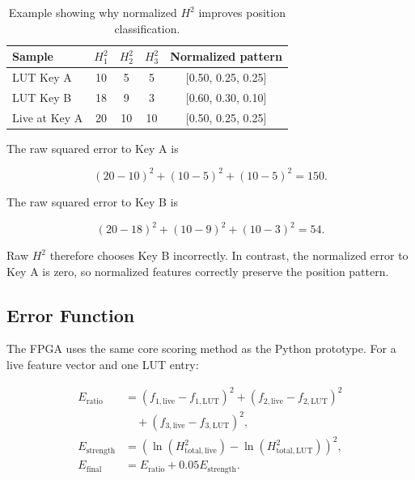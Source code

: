 \begin{table}[H]
    \centering
    \caption{Example showing why normalized $H^2$ improves position classification.}
    \label{tab:normalization_example}
    \renewcommand{\arraystretch}{1.2}
    \begin{tabular}{l c c c c}
        \toprule
        \textbf{Sample} & $H_1^2$ & $H_2^2$ & $H_3^2$ & \textbf{Normalized pattern} \\
        \midrule
        LUT Key A & 10 & 5 & 5 & [0.50, 0.25, 0.25] \\
        LUT Key B & 18 & 9 & 3 & [0.60, 0.30, 0.10] \\
        Live at Key A & 20 & 10 & 10 & [0.50, 0.25, 0.25] \\
        \bottomrule
    \end{tabular}
\end{table}

The raw squared error to Key A is

\begin{equation}
    (20-10)^2 + (10-5)^2 + (10-5)^2 = 150.
\end{equation}

The raw squared error to Key B is

\begin{equation}
    (20-18)^2 + (10-9)^2 + (10-3)^2 = 54.
\end{equation}

Raw $H^2$ therefore chooses Key B incorrectly. In contrast, the normalized error to Key A is zero, so normalized features correctly preserve the position pattern.

\subsection{Error Function}

The FPGA uses the same core scoring method as the Python prototype. For a live feature vector and one LUT entry:

\begin{align}
    E_{\mathrm{ratio}} &=
    (f_{1,\mathrm{live}} - f_{1,\mathrm{LUT}})^2 +
    (f_{2,\mathrm{live}} - f_{2,\mathrm{LUT}})^2 \nonumber \\
    &\quad +
    (f_{3,\mathrm{live}} - f_{3,\mathrm{LUT}})^2, \\
    E_{\mathrm{strength}} &=
    \left(\ln(H_{\mathrm{total,live}}^2) -
    \ln(H_{\mathrm{total,LUT}}^2)\right)^2, \\
    E_{\mathrm{final}} &= E_{\mathrm{ratio}} + 0.05 E_{\mathrm{strength}}.
\end{align}

